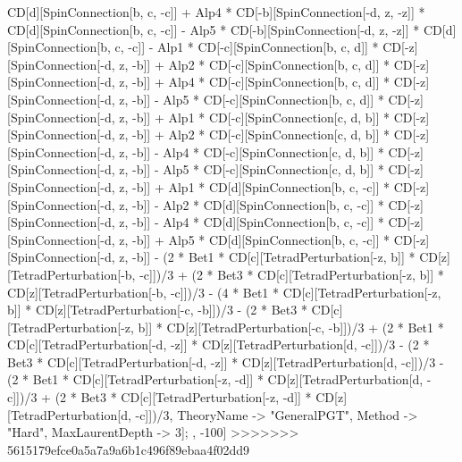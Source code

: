CD[d][SpinConnection[b, c, -c]] + Alp4 * CD[-b][SpinConnection[-d, z, -z]] * CD[d][SpinConnection[b, c, -c]] - Alp5 * CD[-b][SpinConnection[-d, z, -z]] * CD[d][SpinConnection[b, c, -c]] - Alp1 * CD[-c][SpinConnection[b, c, d]] * CD[-z][SpinConnection[-d, z, -b]] + Alp2 * CD[-c][SpinConnection[b, c, d]] * CD[-z][SpinConnection[-d, z, -b]] + Alp4 * CD[-c][SpinConnection[b, c, d]] * CD[-z][SpinConnection[-d, z, -b]] - Alp5 * CD[-c][SpinConnection[b, c, d]] * CD[-z][SpinConnection[-d, z, -b]] + Alp1 * CD[-c][SpinConnection[c, d, b]] * CD[-z][SpinConnection[-d, z, -b]] + Alp2 * CD[-c][SpinConnection[c, d, b]] * CD[-z][SpinConnection[-d, z, -b]] - Alp4 * CD[-c][SpinConnection[c, d, b]] * CD[-z][SpinConnection[-d, z, -b]] - Alp5 * CD[-c][SpinConnection[c, d, b]] * CD[-z][SpinConnection[-d, z, -b]] + Alp1 * CD[d][SpinConnection[b, c, -c]] * CD[-z][SpinConnection[-d, z, -b]] - Alp2 * CD[d][SpinConnection[b, c, -c]] * CD[-z][SpinConnection[-d, z, -b]] - Alp4 * CD[d][SpinConnection[b, c, -c]] * CD[-z][SpinConnection[-d, z, -b]] + Alp5 * CD[d][SpinConnection[b, c, -c]] * CD[-z][SpinConnection[-d, z, -b]] - (2 * Bet1 * CD[c][TetradPerturbation[-z, b]] * CD[z][TetradPerturbation[-b, -c]])/3 + (2 * Bet3 * CD[c][TetradPerturbation[-z, b]] * CD[z][TetradPerturbation[-b, -c]])/3 - (4 * Bet1 * CD[c][TetradPerturbation[-z, b]] * CD[z][TetradPerturbation[-c, -b]])/3 - (2 * Bet3 * CD[c][TetradPerturbation[-z, b]] * CD[z][TetradPerturbation[-c, -b]])/3 + (2 * Bet1 * CD[c][TetradPerturbation[-d, -z]] * CD[z][TetradPerturbation[d, -c]])/3 - (2 * Bet3 * CD[c][TetradPerturbation[-d, -z]] * CD[z][TetradPerturbation[d, -c]])/3 - (2 * Bet1 * CD[c][TetradPerturbation[-z, -d]] * CD[z][TetradPerturbation[d, -c]])/3 + (2 * Bet3 * CD[c][TetradPerturbation[-z, -d]] * CD[z][TetradPerturbation[d, -c]])/3, TheoryName -> "GeneralPGT", Method -> "Hard", MaxLaurentDepth -> 3]; , -100]
>>>>>>> 5615179efce0a5a7a9a6b1c496f89ebaa4f02dd9
